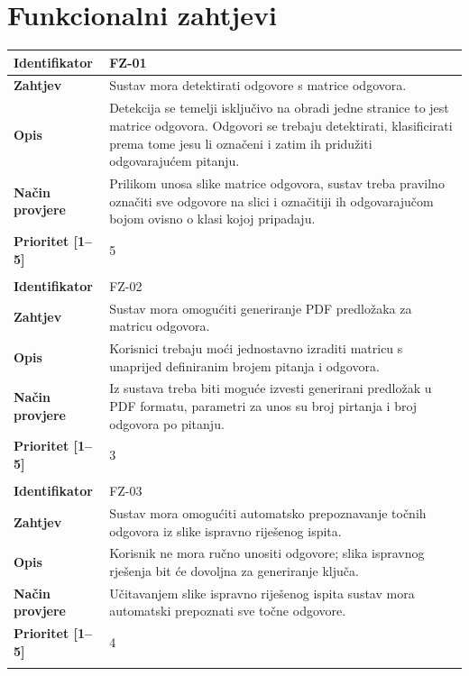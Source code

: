 \documentclass{foi}
\begin{document}
\pagebreak

\section{Funkcionalni zahtjevi}


\begin{longtable}{|l|p{12cm}|}
    \hline
    \textbf{Identifikator} & FZ-01 \\ \hline
    \textbf{Zahtjev} & Sustav mora detektirati odgovore s matrice odgovora. \\ \hline
    \textbf{Opis} & Detekcija se temelji isključivo na obradi jedne stranice to jest matrice odgovora. Odgovori se trebaju detektirati, klasificirati prema tome jesu li označeni i zatim ih pridužiti odgovarajućem pitanju.\\ \hline
    \textbf{Način provjere} & Prilikom unosa slike matrice odgovora, sustav treba pravilno označiti sve odgovore na slici i označitiji ih odgovarajučom bojom ovisno o klasi kojoj pripadaju. \\ \hline
    \textbf{Prioritet [1--5]} & 5 \\ \hline
    \multicolumn{2}{|c|}{} \\ \hline
    
    \textbf{Identifikator} & FZ-02 \\ \hline
    \textbf{Zahtjev} & Sustav mora omogućiti generiranje PDF predložaka za matricu odgovora. \\ \hline
    \textbf{Opis} & Korisnici trebaju moći jednostavno izraditi matricu s unaprijed definiranim brojem pitanja i odgovora. \\ \hline
    \textbf{Način provjere} & Iz sustava treba biti moguće izvesti generirani predložak u PDF formatu, parametri za unos su broj pirtanja i broj odgovora po pitanju. \\ \hline
    \textbf{Prioritet [1--5]} & 3 \\ \hline
    \multicolumn{2}{|c|}{} \\ \hline
    
    \textbf{Identifikator} & FZ-03 \\ \hline
    \textbf{Zahtjev} & Sustav mora omogućiti automatsko prepoznavanje točnih odgovora iz slike ispravno riješenog ispita. \\ \hline
    \textbf{Opis} & Korisnik ne mora ručno unositi odgovore; slika ispravnog rješenja bit će dovoljna za generiranje ključa. \\ \hline
    \textbf{Način provjere} & Učitavanjem slike ispravno riješenog ispita sustav mora automatski prepoznati sve točne odgovore. \\ \hline
    \textbf{Prioritet [1--5]} & 4 \\ \hline
    \multicolumn{2}{|c|}{} \\ \hline
    

\end{longtable}
\end{document}
